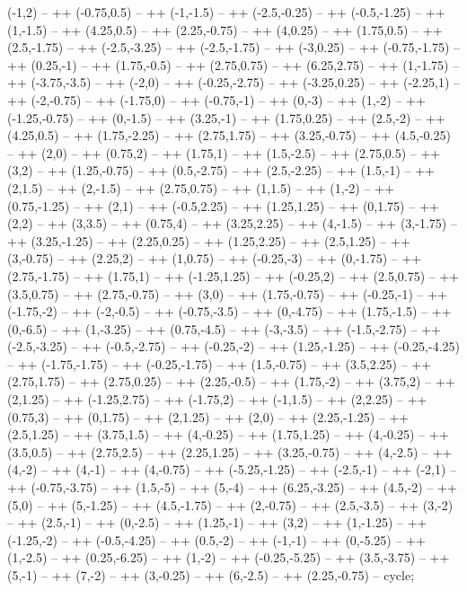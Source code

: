 (-1,2) -- ++ (-0.75,0.5) -- ++ (-1,-1.5) -- ++ (-2.5,-0.25) -- ++ (-0.5,-1.25) -- ++ (1,-1.5) -- ++ (4.25,0.5) -- ++ (2.25,-0.75) -- ++ (4,0.25) -- ++ (1.75,0.5) -- ++ (2.5,-1.75) -- ++ (-2.5,-3.25) -- ++ (-2.5,-1.75) -- ++ (-3,0.25) -- ++ (-0.75,-1.75) -- ++ (0.25,-1) -- ++ (1.75,-0.5) -- ++ (2.75,0.75) -- ++ (6.25,2.75) -- ++ (1,-1.75) -- ++ (-3.75,-3.5) -- ++ (-2,0) -- ++ (-0.25,-2.75) -- ++ (-3.25,0.25) -- ++ (-2.25,1) -- ++ (-2,-0.75) -- ++ (-1.75,0) -- ++ (-0.75,-1) -- ++ (0,-3) -- ++ (1,-2) -- ++ (-1.25,-0.75) -- ++ (0,-1.5) -- ++ (3.25,-1) -- ++ (1.75,0.25) -- ++ (2.5,-2) -- ++ (4.25,0.5) -- ++ (1.75,-2.25) -- ++ (2.75,1.75) -- ++ (3.25,-0.75) -- ++ (4.5,-0.25) -- ++ (2,0) -- ++ (0.75,2) -- ++ (1.75,1) -- ++ (1.5,-2.5) -- ++ (2.75,0.5) -- ++ (3,2) -- ++ (1.25,-0.75) -- ++ (0.5,-2.75) -- ++ (2.5,-2.25) -- ++ (1.5,-1) -- ++ (2,1.5) -- ++ (2,-1.5) -- ++ (2.75,0.75) -- ++ (1,1.5) -- ++ (1,-2) -- ++ (0.75,-1.25) -- ++ (2,1) -- ++ (-0.5,2.25) -- ++ (1.25,1.25) -- ++ (0,1.75) -- ++ (2,2) -- ++ (3,3.5) -- ++ (0.75,4) -- ++ (3.25,2.25) -- ++ (4,-1.5) -- ++ (3,-1.75) -- ++ (3.25,-1.25) -- ++ (2.25,0.25) -- ++ (1.25,2.25) -- ++ (2.5,1.25) -- ++ (3,-0.75) -- ++ (2.25,2) -- ++ (1,0.75) -- ++ (-0.25,-3) -- ++ (0,-1.75) -- ++ (2.75,-1.75) -- ++ (1.75,1) -- ++ (-1.25,1.25) -- ++ (-0.25,2) -- ++ (2.5,0.75) -- ++ (3.5,0.75) -- ++ (2.75,-0.75) -- ++ (3,0) -- ++ (1.75,-0.75) -- ++ (-0.25,-1) -- ++ (-1.75,-2) -- ++ (-2,-0.5) -- ++ (-0.75,-3.5) -- ++ (0,-4.75) -- ++ (1.75,-1.5) -- ++ (0,-6.5) -- ++ (1,-3.25) -- ++ (0.75,-4.5) -- ++ (-3,-3.5) -- ++ (-1.5,-2.75) -- ++ (-2.5,-3.25) -- ++ (-0.5,-2.75) -- ++ (-0.25,-2) -- ++ (1.25,-1.25) -- ++ (-0.25,-4.25) -- ++ (-1.75,-1.75) -- ++ (-0.25,-1.75) -- ++ (1.5,-0.75) -- ++ (3.5,2.25) -- ++ (2.75,1.75) -- ++ (2.75,0.25) -- ++ (2.25,-0.5) -- ++ (1.75,-2) -- ++ (3.75,2) -- ++ (2,1.25) -- ++ (-1.25,2.75) -- ++ (-1.75,2) -- ++ (-1,1.5) -- ++ (2,2.25) -- ++ (0.75,3) -- ++ (0,1.75) -- ++ (2,1.25) -- ++ (2,0) -- ++ (2.25,-1.25) -- ++ (2.5,1.25) -- ++ (3.75,1.5) -- ++ (4,-0.25) -- ++ (1.75,1.25) -- ++ (4,-0.25) -- ++ (3.5,0.5) -- ++ (2.75,2.5) -- ++ (2.25,1.25) -- ++ (3.25,-0.75) -- ++ (4,-2.5) -- ++ (4,-2) -- ++ (4,-1) -- ++ (4,-0.75) -- ++ (-5.25,-1.25) -- ++ (-2.5,-1) -- ++ (-2,1) -- ++ (-0.75,-3.75) -- ++ (1.5,-5) -- ++ (5,-4) -- ++ (6.25,-3.25) -- ++ (4.5,-2) -- ++ (5,0) -- ++ (5,-1.25) -- ++ (4.5,-1.75) -- ++ (2,-0.75) -- ++ (2.5,-3.5) -- ++ (3,-2) -- ++ (2.5,-1) -- ++ (0,-2.5) -- ++ (1.25,-1) -- ++ (3,2) -- ++ (1,-1.25) -- ++ (-1.25,-2) -- ++ (-0.5,-4.25) -- ++ (0.5,-2) -- ++ (-1,-1) -- ++ (0,-5.25) -- ++ (1,-2.5) -- ++ (0.25,-6.25) -- ++ (1,-2) -- ++ (-0.25,-5.25) -- ++ (3.5,-3.75) -- ++ (5,-1) -- ++ (7,-2) -- ++ (3,-0.25) -- ++ (6,-2.5) -- ++ (2.25,-0.75) -- cycle;

